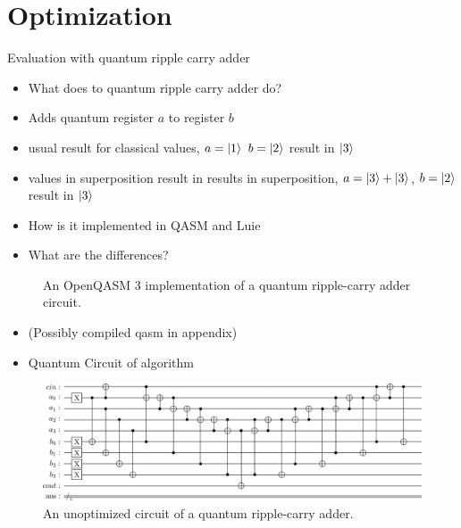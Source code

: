 \section{Optimization}
\label{sec:eval_optimization}
Evaluation with quantum ripple carry adder~\cite{CDKM04}
\begin{itemize}
    \item What does to quantum ripple carry adder do?
    \item Adds quantum register $a$ to register $b$
    \item usual result for classical values, $a = \ket{1}$ $b = \ket{2}$ result in $\ket{3}$
    \item values in superposition result in results in superposition, $a = \ket{3} + \ket{3}$, $b = \ket{2}$ result in $\ket{3}$
    \item How is it implemented in QASM and Luie
    \item What are the differences?
\end{itemize}



\begin{figure}[htp]
    \centering     
    
    \caption{An OpenQASM 3 implementation of a quantum ripple-carry adder circuit.}
    \label{fig:eval_adder_qasm}
\end{figure}



\begin{itemize}
    \item (Possibly compiled qasm in appendix)
    \item Quantum Circuit of algorithm  
\end{itemize}

\begin{figure}[htp]
    \centering     
    \includegraphics[width=\textwidth]{../figures/images/adderCircuit.png}
    \caption{An unoptimized circuit of a quantum ripple-carry adder.}
    \label{fig:eval_adder_circuit}
\end{figure}


